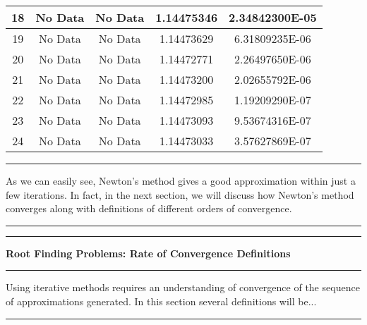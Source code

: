 \documentclass[10pt,fleqn]{article}
\begin{document}
\begin{table}[h]
\begin{center}
\begin{tabular}{|c||c|c||c|c|}
    \hline
      18 & No Data & No Data & 1.14475346 & 2.34842300E-05 \\
    \hline
      19 & No Data & No Data & 1.14473629 & 6.31809235E-06 \\
    \hline
      20 & No Data & No Data & 1.14472771 & 2.26497650E-06 \\
    \hline
      21 & No Data & No Data & 1.14473200 & 2.02655792E-06 \\
    \hline
      22 & No Data & No Data & 1.14472985 & 1.19209290E-07 \\
    \hline
      23 & No Data & No Data & 1.14473093 & 9.53674316E-07 \\
    \hline
      24 & No Data & No Data & 1.14473033 & 3.57627869E-07 \\
    \hline
  \end{tabular}
  \end{center}
\end{table}
\vskip0.1in\hrule\vskip0.1in
\noindent
As we can easily see, Newton's method gives a good approximation within just a
few iterations. In fact, in the next section, we will discuss how Newton's
method converges along with definitions of different orders of convergence.
\vskip0.1in\hrule\vskip0.1in
\newpage
\vskip0.1in\hrule\vskip0.1in
\noindent
{\bf Root Finding Problems: Rate of Convergence Definitions}
\vskip0.1in\hrule\vskip0.1in
\noindent
Using iterative methods requires an understanding of convergence of the sequence
of approximations generated. In this section several definitions will be...
\vskip0.1in\hrule\vskip0.1in
\end{document}
